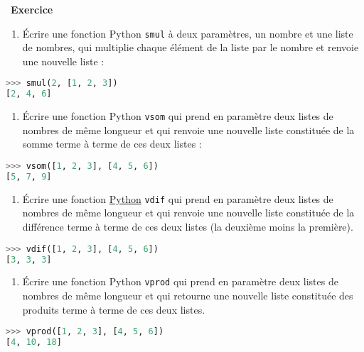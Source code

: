 \documentclass[
  10pt,
]{article}
\newcommand{\passthrough}[1]{#1}
\providecommand{\tightlist}{%
  \setlength{\itemsep}{0pt}\setlength{\parskip}{0pt}}
\newcounter{exo}
\newenvironment{exercice}[1]
{\par \medskip   \addtocounter{exo}{1} \noindent  
\begin{bclogo}[arrondi =0.1,   noborder = true, logo=\bccrayon, marge=4]{~\textbf{Exercice} \textbf{\theexo} {\itshape #1} }  \par}
{
\end{bclogo}
 \par \bigskip }
\newcounter{def}
\begin{document}
\begin{exercice}{}

\begin{enumerate}
\def\labelenumi{\arabic{enumi}.}
\tightlist
\item
  Écrire une fonction Python \passthrough{\lstinline!smul!} à deux
  paramètres, un nombre et une liste de nombres, qui multiplie chaque
  élément de la liste par le nombre et renvoie une nouvelle liste :
\end{enumerate}

\begin{lstlisting}[language=Python]
>>> smul(2, [1, 2, 3])
[2, 4, 6]
\end{lstlisting}

\begin{enumerate}
\def\labelenumi{\arabic{enumi}.}
\setcounter{enumi}{1}
\tightlist
\item
  Écrire une fonction Python \passthrough{\lstinline!vsom!} qui prend en
  paramètre deux listes de nombres de même longueur et qui renvoie une
  nouvelle liste constituée de la somme terme à terme de ces deux listes
  :
\end{enumerate}

\begin{lstlisting}[language=Python]
>>> vsom([1, 2, 3], [4, 5, 6])
[5, 7, 9]
\end{lstlisting}

\begin{enumerate}
\def\labelenumi{\arabic{enumi}.}
\setcounter{enumi}{2}
\tightlist
\item
  Écrire une fonction
  \href{https://docs.python.org/3/tutorial/datastructures.html}{Python}
  \passthrough{\lstinline!vdif!} qui prend en paramètre deux listes de
  nombres de même longueur et qui renvoie une nouvelle liste constituée
  de la différence terme à terme de ces deux listes (la deuxième moins
  la première).
\end{enumerate}

\begin{lstlisting}[language=Python]
>>> vdif([1, 2, 3], [4, 5, 6])
[3, 3, 3]
\end{lstlisting}

\begin{enumerate}
\def\labelenumi{\arabic{enumi}.}
\setcounter{enumi}{3}
\tightlist
\item
  Écrire une fonction Python \passthrough{\lstinline!vprod!} qui prend
  en paramètre deux listes de nombres de même longueur et qui retourne
  une nouvelle liste constituée des produits terme à terme de ces deux
  listes.
\end{enumerate}

\begin{lstlisting}[language=Python]
>>> vprod([1, 2, 3], [4, 5, 6]) 
[4, 10, 18]
\end{lstlisting}

\end{exercice}
\end{document}
